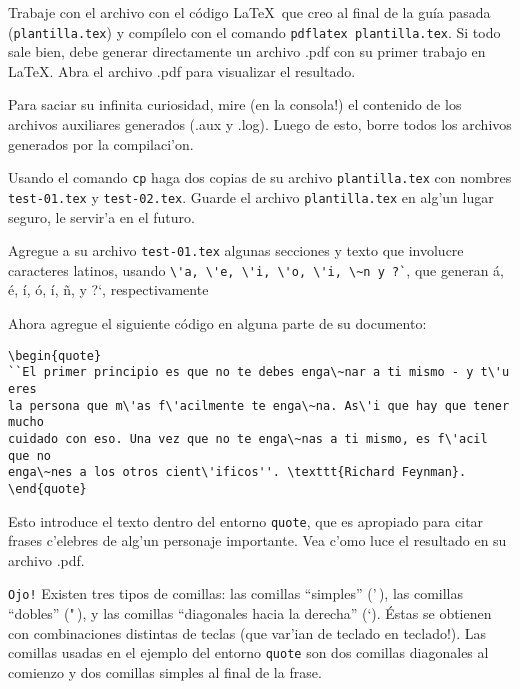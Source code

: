 \documentclass[11pt]{exam}
\begin{document}
\begin{questions}
\item Trabaje con el archivo con el código \LaTeX\ que creo al final de la guía pasada (\texttt{plantilla.tex}) y compílelo con el comando \texttt{pdflatex plantilla.tex}. Si todo sale bien, debe generar directamente un archivo .pdf con su primer trabajo en \LaTeX.
Abra el archivo .pdf para visualizar el resultado.

\item Para saciar su infinita curiosidad, mire (en la consola!) el contenido de los archivos auxiliares generados (.aux y .log). Luego de esto, borre todos los archivos generados por la compilaci'on.

\item Usando el comando \texttt{cp} haga dos copias de su archivo \texttt{plantilla.tex} con nombres \texttt{test-01.tex} y \texttt{test-02.tex}. Guarde el archivo \texttt{plantilla.tex} en alg'un lugar seguro, le servir'a en el futuro.

\item Agregue a su archivo \texttt{test-01.tex} algunas secciones y texto que involucre caracteres latinos, usando \verb|\'a, \'e, \'i, \'o, \'i, \~n y ?`|, que generan \'a, \'e, \'i, \'o, \'i, \~n, y ?`, respectivamente

\item Ahora agregue el siguiente código en alguna parte de su documento:

\begin{verbatim}
\begin{quote}
``El primer principio es que no te debes enga\~nar a ti mismo - y t\'u eres 
la persona que m\'as f\'acilmente te enga\~na. As\'i que hay que tener mucho 
cuidado con eso. Una vez que no te enga\~nas a ti mismo, es f\'acil que no 
enga\~nes a los otros cient\'ificos''. \texttt{Richard Feynman}.
\end{quote}
\end{verbatim}

Esto introduce el texto dentro del entorno \texttt{quote}, que es apropiado para citar frases c'elebres de alg'un personaje importante. Vea c'omo luce el resultado en su archivo .pdf.

\texttt{Ojo!} Existen tres tipos de comillas: 	las comillas ``simples'' ('\,), las comillas ``dobles'' ("\,), y las comillas ``diagonales hacia la derecha'' (`). \'Estas se obtienen con combinaciones distintas de teclas (que var'ian de teclado en teclado!). Las comillas usadas en el ejemplo del entorno \texttt{quote} son dos comillas diagonales al comienzo y dos comillas simples al final de la frase.



\end{questions}
\end{document}
